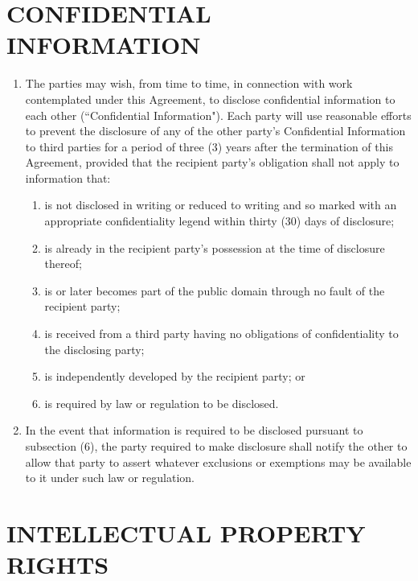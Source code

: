 \documentclass[11pt]{article}
\begin{document}
\section{CONFIDENTIAL INFORMATION }    
\begin{enumerate}  \itemsep4pt \parskip0pt 
\item The parties may wish, from time to time, in connection with work       contemplated under this Agreement, to disclose confidential       information to each other (``Confidential Information"). Each party       will use reasonable efforts to prevent the disclosure of any of       the other party's Confidential Information to third parties for a       period of three (3) years after the termination of this Agreement,       provided that the recipient party's obligation shall not apply to       information that:               
\begin{enumerate}  \itemsep4pt \parskip0pt 
\item  is not disclosed in writing or reduced to writing and so                 marked with an appropriate confidentiality legend within                 thirty (30) days of disclosure;              
\item is already in the recipient party's possession at the                 time of disclosure thereof;              
\item  is or later becomes part of the public domain through no                 fault of the recipient party;              
\item  is received from a third party having no obligations of                 confidentiality to the disclosing party;              
\item is independently developed by the recipient party; or              
\item is required by law or regulation to be disclosed.     
\end{enumerate}
\item In the event that information is required to be disclosed pursuant       to subsection (6), the party required to make disclosure shall       notify the other to allow that party to assert whatever exclusions       or exemptions may be available to it under such law or regulation.  
\end{enumerate}


\section{INTELLECTUAL PROPERTY RIGHTS } 
\end{document}
